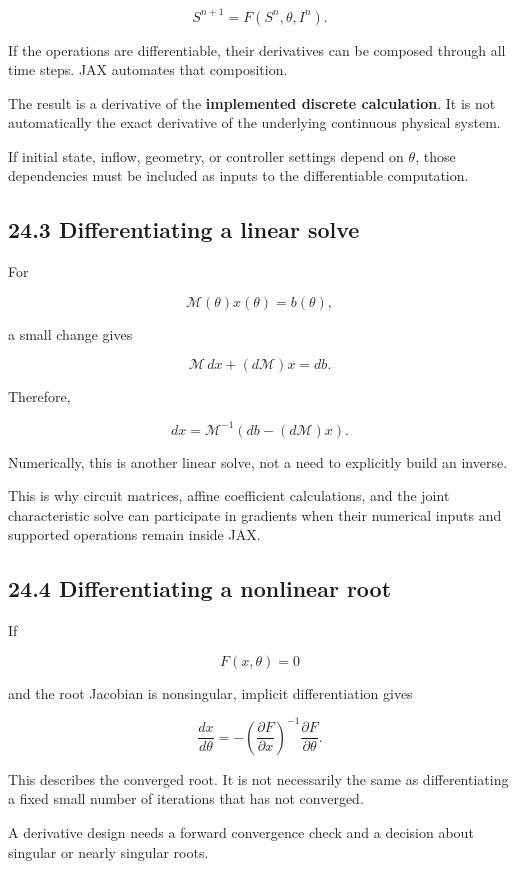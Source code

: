 \documentclass[11pt,a4paper]{article}
\begin{document}
\begingroup\small
\[
S^{n+1}=F(S^n,\theta,I^n).
\]
\endgroup


If the operations are differentiable, their derivatives can be composed through all time steps. JAX automates that composition.

The result is a derivative of the \textbf{implemented discrete calculation}. It is not automatically the exact derivative of the underlying continuous physical system.

If initial state, inflow, geometry, or controller settings depend on \(\theta\), those dependencies must be included as inputs to the differentiable computation.

\subsection{24.3 Differentiating a linear solve}
For


\begingroup\small
\[
\mathcal M(\theta)x(\theta)=b(\theta),
\]
\endgroup


a small change gives


\begingroup\small
\[
\mathcal M\,dx+(d\mathcal M)x=db.
\]
\endgroup


Therefore,


\begingroup\small
\[
dx=\mathcal M^{-1}(db-(d\mathcal M)x).
\]
\endgroup


Numerically, this is another linear solve, not a need to explicitly build an inverse.

This is why circuit matrices, affine coefficient calculations, and the joint characteristic solve can participate in gradients when their numerical inputs and supported operations remain inside JAX.

\subsection{24.4 Differentiating a nonlinear root}
If


\begingroup\small
\[
F(x,\theta)=0
\]
\endgroup


and the root Jacobian is nonsingular, implicit differentiation gives


\begingroup\small
\[
\frac{dx}{d\theta}
=
-\left(\frac{\partial F}{\partial x}\right)^{-1}
\frac{\partial F}{\partial\theta}.
\]
\endgroup


This describes the converged root. It is not necessarily the same as differentiating a fixed small number of iterations that has not converged.

A derivative design needs a forward convergence check and a decision about singular or nearly singular roots.
\end{document}
